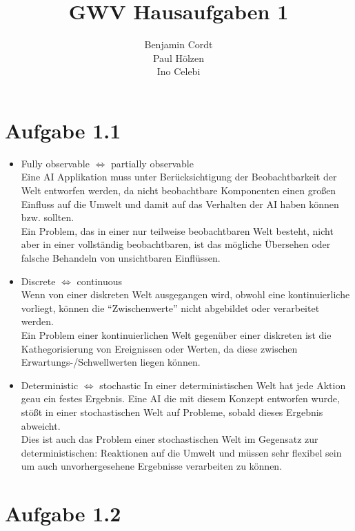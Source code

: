 \documentclass[12pt, paper=a4]{article}
\author{Benjamin Cordt\\Paul Hölzen\\Ino Celebi}
\title{GWV Hausaufgaben 1}
\begin{document}
\maketitle

\section*{Aufgabe 1.1}
\begin{itemize}
\item Fully observable $\Leftrightarrow$ partially observable\\
      Eine AI Applikation muss unter Berücksichtigung der Beobachtbarkeit der Welt entworfen werden, da
      nicht beobachtbare Komponenten einen großen Einfluss auf die Umwelt und damit auf das Verhalten der
      AI haben können bzw. sollten.\\
      Ein Problem, das in einer nur teilweise beobachtbaren Welt besteht, nicht aber in einer vollständig
      beobachtbaren, ist das mögliche Übersehen oder falsche Behandeln von unsichtbaren Einflüssen.
\item Discrete $\Leftrightarrow$ continuous\\
      Wenn von einer diskreten Welt ausgegangen wird, obwohl eine kontinuierliche vorliegt, können die
      ``Zwischenwerte'' nicht abgebildet oder verarbeitet werden.\\
      Ein Problem einer kontinuierlichen Welt gegenüber einer diskreten ist die Kathegorisierung von
      Ereignissen oder Werten, da diese zwischen Erwartungs-/Schwellwerten liegen können.
\item Deterministic $\Leftrightarrow$ stochastic
      In einer deterministischen Welt hat jede Aktion geau ein festes Ergebnis. Eine AI die mit diesem
      Konzept entworfen wurde, stößt in einer stochastischen Welt auf Probleme, sobald dieses Ergebnis
      abweicht.\\
      Dies ist auch das Problem einer stochastischen Welt im Gegensatz zur deterministischen: Reaktionen
      auf die Umwelt und müssen sehr flexibel sein um auch unvorhergesehene Ergebnisse verarbeiten zu
      können.
\end{itemize}

\section*{Aufgabe 1.2}
\end{document}
